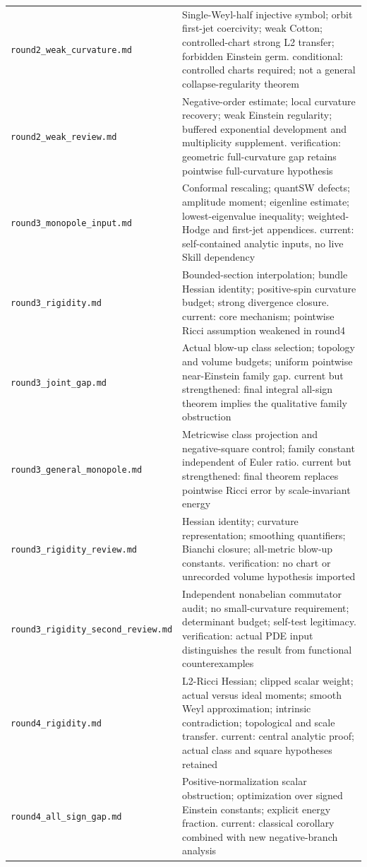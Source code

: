 \documentclass[UTF8,fontset=fandol,zihao=-4]{ctexart}
\theoremstyle{cn}
\begin{document}
\begin{longtable}{L{.34\textwidth}L{.59\textwidth}}
\nolinkurl{round2_weak_curvature.md} & Single-Weyl-half injective symbol; orbit first-jet coercivity; weak Cotton; controlled-chart strong L2 transfer; forbidden Einstein germ. conditional: controlled charts required; not a general collapse-regularity theorem\\
\nolinkurl{round2_weak_review.md} & Negative-order estimate; local curvature recovery; weak Einstein regularity; buffered exponential development and multiplicity supplement. verification: geometric full-curvature gap retains pointwise full-curvature hypothesis\\
\nolinkurl{round3_monopole_input.md} & Conformal rescaling; quantSW defects; amplitude moment; eigenline estimate; lowest-eigenvalue inequality; weighted-Hodge and first-jet appendices. current: self-contained analytic inputs, no live Skill dependency\\
\nolinkurl{round3_rigidity.md} & Bounded-section interpolation; bundle Hessian identity; positive-spin curvature budget; strong divergence closure. current: core mechanism; pointwise Ricci assumption weakened in round4\\
\nolinkurl{round3_joint_gap.md} & Actual blow-up class selection; topology and volume budgets; uniform pointwise near-Einstein family gap. current but strengthened: final integral all-sign theorem implies the qualitative family obstruction\\
\nolinkurl{round3_general_monopole.md} & Metricwise class projection and negative-square control; family constant independent of Euler ratio. current but strengthened: final theorem replaces pointwise Ricci error by scale-invariant energy\\
\nolinkurl{round3_rigidity_review.md} & Hessian identity; curvature representation; smoothing quantifiers; Bianchi closure; all-metric blow-up constants. verification: no chart or unrecorded volume hypothesis imported\\
\nolinkurl{round3_rigidity_second_review.md} & Independent nonabelian commutator audit; no small-curvature requirement; determinant budget; self-test legitimacy. verification: actual PDE input distinguishes the result from functional counterexamples\\
\nolinkurl{round4_rigidity.md} & L2-Ricci Hessian; clipped scalar weight; actual versus ideal moments; smooth Weyl approximation; intrinsic contradiction; topological and scale transfer. current: central analytic proof; actual class and square hypotheses retained\\
\nolinkurl{round4_all_sign_gap.md} & Positive-normalization scalar obstruction; optimization over signed Einstein constants; explicit energy fraction. current: classical corollary combined with new negative-branch analysis\\

\end{longtable}
\end{document}
